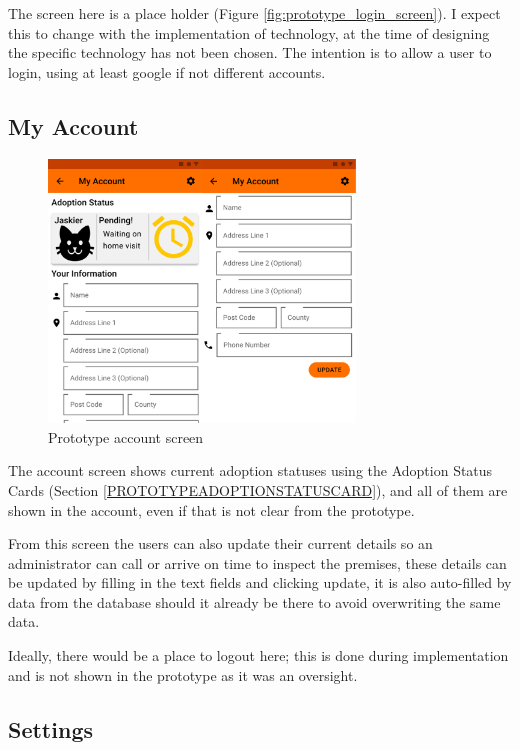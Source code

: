 The screen here is a place holder (Figure \ref{fig:prototype_login_screen}). I expect this to change with the implementation of technology, at the time of designing the specific technology has not been chosen. The intention is to allow a user to login, using at least google if not different accounts.

\subsection{My Account} \label{PROTOTYPEMYACCOUNTPAGE}

\begin{figure} [htbp!]
    \centering
    \includegraphics[height=7cm]{Images/PrototypeMyAccount.png}
    \caption{Prototype account screen}
    \label{fig:prototype_account_screen}
\end{figure}

The account screen shows current adoption statuses using the Adoption Status Cards (Section \ref{PROTOTYPEADOPTIONSTATUSCARD}), and all of them are shown in the account, even if that is not clear from the prototype. 

From this screen the users can also update their current details so an administrator can call or arrive on time to inspect the premises, these details can be updated by filling in the text fields and clicking update, it is also auto-filled by data from the database should it already be there to avoid overwriting the same data.

Ideally, there would be a place to logout here; this is done during implementation and is not shown in the prototype as it was an oversight.

\subsection{Settings}


